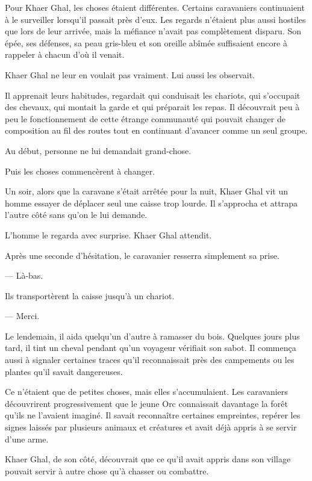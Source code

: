 Pour Khaer Ghal, les choses étaient différentes. Certains caravaniers
continuaient à le surveiller lorsqu'il passait près d'eux. Les regards
n'étaient plus aussi hostiles que lors de leur arrivée, mais la méfiance
n'avait pas complètement disparu. Son épée, ses défenses, sa peau gris-bleu et
son oreille abîmée suffisaient encore à rappeler à chacun d'où il venait.

Khaer Ghal ne leur en voulait pas vraiment. Lui aussi les observait.

Il apprenait leurs habitudes, regardait qui conduisait les chariots, qui
s'occupait des chevaux, qui montait la garde et qui préparait les repas. Il
découvrait peu à peu le fonctionnement de cette étrange communauté qui pouvait
changer de composition au fil des routes tout en continuant d'avancer comme un
seul groupe.

Au début, personne ne lui demandait grand-chose.

Puis les choses commencèrent à changer.

Un soir, alors que la caravane s'était arrêtée pour la nuit, Khaer Ghal vit un
homme essayer de déplacer seul une caisse trop lourde. Il s'approcha et attrapa
l'autre côté sans qu'on le lui demande.

L'homme le regarda avec surprise. Khaer Ghal attendit.

Après une seconde d'hésitation, le caravanier resserra simplement sa prise.

— Là-bas.

Ils transportèrent la caisse jusqu'à un chariot.

— Merci.

Le lendemain, il aida quelqu'un d'autre à ramasser du bois. Quelques jours
plus tard, il tint un cheval pendant qu'un voyageur vérifiait son sabot. Il
commença aussi à signaler certaines traces qu'il reconnaissait près des
campements ou les plantes qu'il savait dangereuses.

Ce n'étaient que de petites choses, mais elles s'accumulaient. Les caravaniers
découvrirent progressivement que le jeune Orc connaissait davantage la forêt
qu'ils ne l'avaient imaginé. Il savait reconnaître certaines empreintes,
repérer les signes laissés par plusieurs animaux et créatures et avait déjà
appris à se servir d'une arme.

Khaer Ghal, de son côté, découvrait que ce qu'il avait appris dans son village
pouvait servir à autre chose qu'à chasser ou combattre.

\scenebreak

